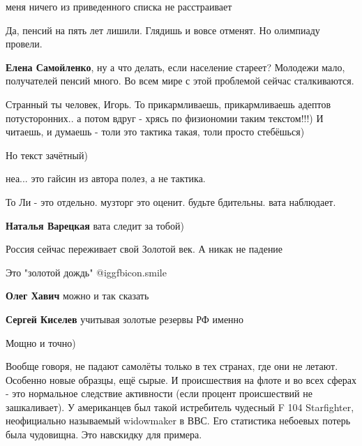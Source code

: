 \begin{itemize}
\begin{itemize}
меня ничего из приведенного списка не расстраивает

Да, пенсий на пять лет лишили. Глядишь и вовсе отменят. Но олимпиаду провели.

\textbf{Елена Самойленко}, ну а что делать, если население стареет? Молодежи мало, получателей пенсий много. Во всем мире с этой проблемой сейчас сталкиваются.
\end{itemize} %


Странный ты человек, Игорь. То прикармливаешь, прикармливаешь адептов
потусторонних.. а потом вдруг - хрясь по физиономии таким текстом!!!) И
читаешь, и думаешь - толи это тактика такая, толи просто стебёшься)

Но текст зачётный)

\begin{itemize} %
неа... это гайсин из автора полез, а не тактика.

То Ли - это отдельно.
музторг это оценит. будьте бдительны. вата наблюдает.

\textbf{Наталья Варецкая} вата следит за тобой)
\end{itemize} %


Россия сейчас переживает свой Золотой век. А никак не падение

\begin{itemize} %
Это "золотой дождь"  @igg{fbicon.smile} 

\textbf{Олег Хавич} можно и так сказать

\textbf{Сергей Киселев} учитывая золотые резервы РФ именно
\end{itemize} %

Мощно и точно)


Вообще говоря, не падают самолёты только в тех странах, где они не летают.
Особенно новые образцы, ещё сырые. И происшествия на флоте и во всех сферах -
это нормальное следствие активности (если процент происшествий не зашкаливает).
У американцев был такой истребитель чудесный F 104 Starfighter, неофициально
называемый widowmaker в ВВС. Его статистика небоевых потерь была чудовищна. Это
навскидку для примера.


\end{itemize}
